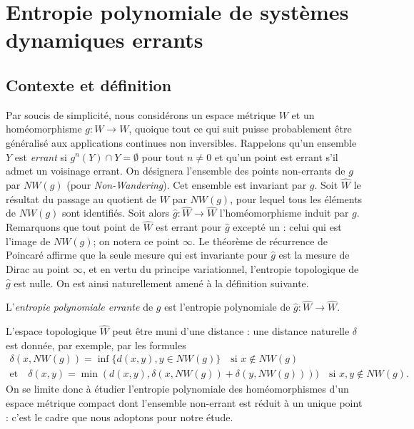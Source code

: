 \section{Entropie polynomiale de systèmes dynamiques errants}\label{s.wandering}

\subsection{Contexte et définition}

Par soucis de simplicité, nous considérons un espace métrique $W$ et un homéomorphisme $g: W \to W$, quoique tout ce qui suit puisse probablement être généralisé aux applications continues non inversibles. Rappelons qu'un ensemble $Y$ est \emph{errant} si $g^n(Y) \cap Y =\emptyset$ pour tout $n \neq 0$ et qu'un point est errant s'il admet un voisinage errant. On désignera l'ensemble des points non-errants de $g$ par $NW(g)$ (pour \emph{Non-Wandering}). Cet ensemble est invariant par $g$. Soit $\hat W$ le résultat du passage au quotient de $W$ par $NW(g)$, pour lequel tous les éléments de $NW(g)$ sont identifiés. Soit alors $\hat g: \hat W \to \hat W$ l'homéomorphisme induit par $g$. Remarquons que tout point de $\hat W$ est errant pour $\hat g$ excepté un : celui qui est l'image de $NW(g)$; on notera ce point $\infty$. Le théorème de récurrence de Poincaré affirme que la seule mesure qui est invariante pour $\hat g$ est la mesure de Dirac au point $\infty$, et en vertu du principe variationnel, l'entropie topologique de $\hat g$ est nulle. On est ainsi naturellement amené à la définition suivante.

\begin{defi}
L'\emph{entropie polynomiale errante} de $g$ est l'entropie polynomiale de $\hat g: \hat W \to \hat W$.
\end{defi}

L'espace topologique $\hat W$ peut être muni d'une distance : une distance naturelle $\delta$ est donnée, par exemple, par les formules
\begin{gather*}
\delta(x,NW(g))= \inf\{d(x,y), y \in NW(g)\} \quad\text{si } x \not \in NW(g)
\\
\text{et}\quad \delta(x,y) = \min(d(x,y), \delta(x,NW(g))+\delta(y,NW(g)))) \quad\text{si } x,y \not \in NW(g).
\end{gather*}
On se limite donc à étudier l'entropie polynomiale des homéomorphismes d'un espace métrique compact dont l'ensemble non-errant est réduit à un unique point : c'est le cadre que nous adoptons pour notre étude.

